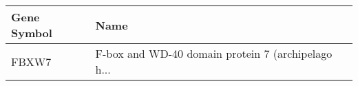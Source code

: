 \begin{tabular}{ll}
\toprule
Gene Symbol &                                               Name \\
\midrule
      FBXW7 & F-box and WD-40 domain protein 7 (archipelago h... \\
\bottomrule
\end{tabular}
